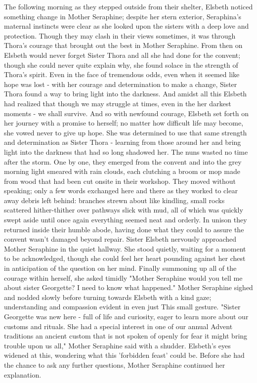\documentclass[11pt]{article}
\begin{document}
The following morning as they stepped outside from their shelter, Elsbeth noticed something change in Mother Seraphine; despite her stern exterior, Seraphina's maternal instincts were clear as she looked upon the sisters with a deep love and protection. Though they may clash in their views sometimes, it was through Thora's courage that brought out the best in Mother Seraphine.
From then on Elsbeth would never forget Sister Thora and all she had done for the convent; though she could never quite explain why, she found solace in the strength of Thora's spirit. Even in the face of tremendous odds, even when it seemed like hope was lost - with her courage and determination to make a change, Sister Thora found a way to bring light into the darkness. And amidst all this Elsbeth had realized that though we may struggle at times, even in the her darkest moments - we shall survive.
And so with newfound courage, Elsbeth set forth on her journey with a promise to herself; no matter how difficult life may become, she vowed never to give up hope. She was determined to use that same strength and determination as Sister Thora - learning from those around her and bring light into the darkness that had so long shadowed her.
The nuns wasted no time after the storm. One by one, they emerged from the convent and into the grey morning light smeared with rain clouds, each clutching a broom or mop made from wood that had been cut onsite in their workshop. They moved without speaking; only a few words exchanged here and there as they worked to clear away debris left behind: branches strewn about like kindling, small rocks scattered hither-thither over pathways slick with mud, all of which was quickly swept aside until once again everything seemed neat and orderly. In unison they returned inside their humble abode, having done what they could to assure the convent wasn't damaged beyond repair.
Sister Elsbeth nervously approached Mother Seraphine in the quiet hallway. She stood quietly, waiting for a moment to be acknowledged, though she could feel her heart pounding against her chest in anticipation of the question on her mind. Finally summoning up all of the courage within herself, she asked timidly "Mother Seraphine would you tell me about sister Georgette? I need to know what happened." Mother Seraphine sighed and nodded slowly before turning towards Elsbeth with a kind gaze; understanding and compassion evident in even just This small gesture.
"Sister Georgette was new here - full of life and curiosity, eager to learn more about our customs and rituals. She had a special interest in one of our annual Advent traditions  an ancient custom that is not spoken of openly for fear it might bring trouble upon us all," Mother Seraphine said with a shudder. Elsbeth's eyes widened at this, wondering what this 'forbidden feast' could be. Before she had the chance to ask any further questions, Mother Seraphine continued her explanation.
\end{document}
